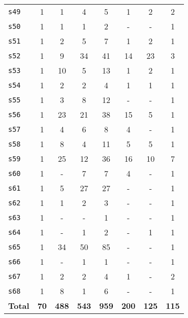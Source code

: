 \begin{longtable}{ l c c c c c c c }
\texttt{s49} & 1 & 1 & 4 & 5 & 1 & 2 & 2 \\
\texttt{s50} & 1 & 1 & 1 & 2 & - & - & 1 \\
\texttt{s51} & 1 & 2 & 5 & 7 & 1 & 2 & 1 \\
\texttt{s52} & 1 & 9 & 34 & 41 & 14 & 23 & 3 \\
\texttt{s53} & 1 & 10 & 5 & 13 & 1 & 2 & 1 \\
\texttt{s54} & 1 & 2 & 2 & 4 & 1 & 1 & 1 \\
\texttt{s55} & 1 & 3 & 8 & 12 & - & - & 1 \\
\texttt{s56} & 1 & 23 & 21 & 38 & 15 & 5 & 1 \\
\texttt{s57} & 1 & 4 & 6 & 8 & 4 & - & 1 \\
\texttt{s58} & 1 & 8 & 4 & 11 & 5 & 5 & 1 \\
\texttt{s59} & 1 & 25 & 12 & 36 & 16 & 10 & 7 \\
\texttt{s60} & 1 & - & 7 & 7 & 4 & - & 1 \\
\texttt{s61} & 1 & 5 & 27 & 27 & - & - & 1 \\
\texttt{s62} & 1 & 1 & 2 & 3 & - & - & 1 \\
\texttt{s63} & 1 & - & - & 1 & - & - & 1 \\
\texttt{s64} & 1 & - & 1 & 2 & - & 1 & 1 \\
\texttt{s65} & 1 & 34 & 50 & 85 & - & - & 1 \\
\texttt{s66} & 1 & - & 1 & 1 & - & - & 1 \\
\texttt{s67} & 1 & 2 & 2 & 4 & 1 & - & 2 \\
\texttt{s68} & 1 & 8 & 1 & 6 & - & - & 1 \\
\hline
{\bf Total} &
  {\bf 70} &
  {\bf 488}   &
  {\bf 543}  &
  {\bf 959} &
  {\bf 200}  &
  {\bf 125}   &
  {\bf 115} \\
\hline
\end{longtable}
